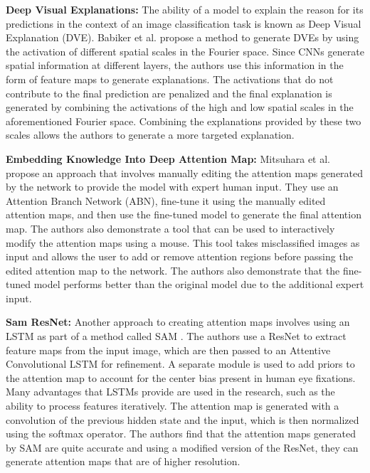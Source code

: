 \documentclass[a4paper,11pt,openright]{book}
\begin{document}
\textbf{Deep Visual Explanations: }
The ability of a model to explain the reason for its predictions in the context of an image classification task is known as Deep Visual Explanation (DVE). Babiker et al. \cite{babikerIntroductionDeepVisual2018} propose a method to generate DVEs by using the activation of different spatial scales in the Fourier space. Since CNNs generate spatial information at different layers, the authors use this information in the form of feature maps to generate explanations. The activations that do not contribute to the final prediction are penalized and the final explanation is generated by combining the activations of the high and low spatial scales in the aforementioned Fourier space. Combining the explanations provided by these two scales allows the authors to generate a more targeted explanation.

\textbf{Embedding Knowledge Into Deep Attention Map: }
Mitsuhara et al. \cite{mitsuharaEmbeddingHumanKnowledge2019} propose an approach that involves manually editing the attention maps generated by the network to provide the model with expert human input. They use an Attention Branch Network (ABN), fine-tune it using the manually edited attention maps, and then use the fine-tuned model to generate the final attention map. The authors also demonstrate a tool that can be used to interactively modify the attention maps using a mouse. This tool takes misclassified images as input and allows the user to add or remove attention regions before passing the edited attention map to the network. The authors also demonstrate that the fine-tuned model performs better than the original model due to the additional expert input.

\textbf{Sam ResNet: }
Another approach to creating attention maps involves using an LSTM as part of a method called SAM \cite{corniaPredictingHumanEye2018} . The authors use a ResNet to extract feature maps from the input image, which are then passed to an Attentive Convolutional LSTM for refinement. A separate module is used to add priors to the attention map to account for the center bias present in human eye fixations. Many advantages that LSTMs provide are used in the research, such as the ability to process features iteratively. The attention map is generated with a convolution of the previous hidden state and the input, which is then normalized using the softmax operator. The authors find that the attention maps generated by SAM are quite accurate and using a modified version of the ResNet, they can generate attention maps that are of higher resolution.
\end{document}
